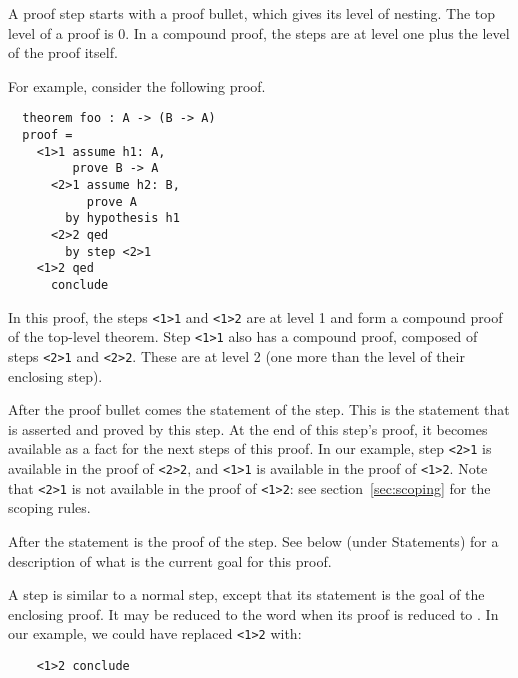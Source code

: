 A proof step starts with a proof bullet, which gives its level of
nesting.  The top level of a proof is 0.  In a compound proof, the
steps are at level one plus the level of the proof itself.

\goodbreak
For example, consider the following proof.

\begin{verbatim}
  theorem foo : A -> (B -> A)
  proof =
    <1>1 assume h1: A,
         prove B -> A
      <2>1 assume h2: B,
           prove A
        by hypothesis h1
      <2>2 qed
        by step <2>1
    <1>2 qed
      conclude
\end{verbatim}

In this proof, the steps \verb"<1>1" and \verb"<1>2" are at level 1
and form a compound proof of the top-level theorem.  Step \verb"<1>1"
also has a compound proof, composed of steps \verb"<2>1"
and \verb"<2>2".  These are at level 2 (one more than the level of
their enclosing step).

After the proof bullet comes the statement of the step.  This is the
statement that is asserted and proved by this step.  At the end of
this step's proof, it becomes available as a fact for the next steps
of this proof.  In our example, step \verb"<2>1" is available in the
proof of \verb"<2>2", and \verb"<1>1" is available in the proof of
\verb"<1>2".  Note that \verb"<2>1" is not available in the proof of
\verb"<1>2": see section~\ref{sec:scoping} for the scoping rules.

After the statement is the proof of the step.  See below (under
Statements) for a description of what is the current goal for this
proof.

\begin{syn}
 \is
       
\alt {} 
\end{syn}


A  step is similar to a normal step, except that its
statement is the goal of the enclosing proof.  It may be reduced to
the word  when its proof is reduced to
.  In our example, we could have replaced
\verb"<1>2" with:
\begin{verbatim}
    <1>2 conclude
\end{verbatim}


